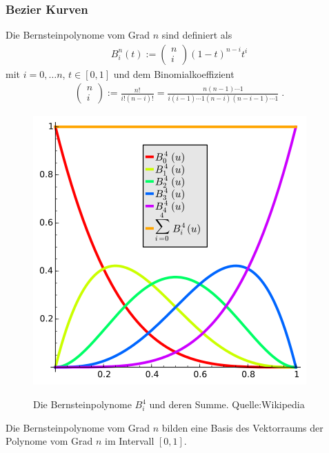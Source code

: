 \subsubsection{Bezier Kurven}
\begin{Definition}
Die Bernsteinpolynome vom Grad $n$ sind definiert als
\begin{align*}
B_i^n(t) := \begin{pmatrix} n \\ i \end{pmatrix} (1-t)^{n-i}t^i
\end{align*}
mit $i = 0, \hdots n$, $t \in [0,1]$ und dem Binomialkoeffizient
\begin{align*}
\begin{pmatrix} n \\ i \end{pmatrix} := \frac{n!}{i!(n-i)!} = \frac{n(n-1) \cdots 1}{i(i-1) \cdots 1 (n-i) (n-i-1) \cdots 1 } \; .
\end{align*}
\end{Definition}

\begin{figure}[H]
    \centering
    \includegraphics[scale=0.8]{images/Bernstein_Polynomials.png}
    \label{fig:bernstein-polynomial}
    \caption{Die Bernsteinpolynome $B^{4}_i$ und deren Summe. Quelle:Wikipedia}
\end{figure}

\begin{Bemerkung}
Die Bernsteinpolynome vom Grad $n$ bilden eine Basis des Vektorraums der Polynome vom Grad $n$ im Intervall $[0,1]$.
\end{Bemerkung}

